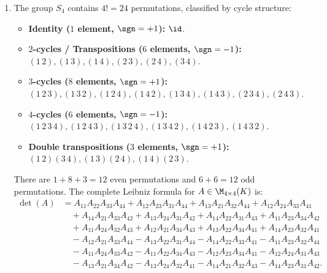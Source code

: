 \begin{exercisesolution*}
\label{sol:symmetric_group_s4_and_alternating}
\begin{enumerate}[label=\textbf{(\alph*)}]
    \item The group $S_4$ contains $4! = 24$ permutations, classified by cycle structure:
    \begin{itemize}
        \item \textbf{Identity ($1$ element, $\sgn = +1$):} $\id$.
        \item \textbf{$2$-cycles / Transpositions ($6$ elements, $\sgn = -1$):}
        $(1\,2), (1\,3), (1\,4), (2\,3), (2\,4), (3\,4)$.
        \item \textbf{$3$-cycles ($8$ elements, $\sgn = +1$):} \\
        $(1\,2\,3), (1\,3\,2), (1\,2\,4), (1\,4\,2), (1\,3\,4), (1\,4\,3), (2\,3\,4), (2\,4\,3)$.
        \item \textbf{$4$-cycles ($6$ elements, $\sgn = -1$):}
        $(1\,2\,3\,4), (1\,2\,4\,3), (1\,3\,2\,4), (1\,3\,4\,2), (1\,4\,2\,3), (1\,4\,3\,2)$.
        \item \textbf{Double transpositions ($3$ elements, $\sgn = +1$):}
        $(1\,2)(3\,4), (1\,3)(2\,4), (1\,4)(2\,3)$.
    \end{itemize}
    There are $1 + 8 + 3 = 12$ even permutations and $6 + 6 = 12$ odd permutations.
    The complete Leibniz formula for $A \in \M_{4 \times 4}(K)$ is:
    \begin{align*}
    \det(A) &= A_{11}A_{22}A_{33}A_{44} + A_{12}A_{23}A_{31}A_{44} + A_{13}A_{21}A_{32}A_{44} + A_{12}A_{24}A_{33}A_{41} \\
    &\quad + A_{14}A_{21}A_{33}A_{42} + A_{13}A_{24}A_{31}A_{42} + A_{14}A_{22}A_{31}A_{43} + A_{11}A_{23}A_{34}A_{42} \\
    &\quad + A_{11}A_{24}A_{32}A_{43} + A_{12}A_{21}A_{34}A_{43} + A_{13}A_{22}A_{34}A_{41} + A_{14}A_{23}A_{32}A_{41} \\
    &\quad - A_{12}A_{21}A_{33}A_{44} - A_{13}A_{22}A_{31}A_{44} - A_{14}A_{22}A_{33}A_{41} - A_{11}A_{23}A_{32}A_{44} \\
    &\quad - A_{11}A_{24}A_{33}A_{42} - A_{11}A_{22}A_{34}A_{43} - A_{12}A_{23}A_{34}A_{41} - A_{12}A_{24}A_{31}A_{43} \\
    &\quad - A_{13}A_{21}A_{34}A_{42} - A_{13}A_{24}A_{32}A_{41} - A_{14}A_{21}A_{32}A_{43} - A_{14}A_{23}A_{31}A_{42}.
    \end{align*}


\end{enumerate}
\end{exercisesolution*}
